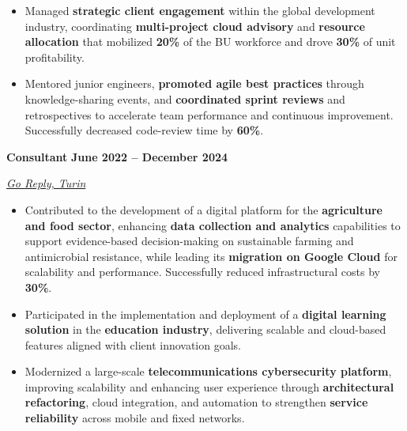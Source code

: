 \documentclass[9pt, a4paper]{article}
\newcommand{\cvsubsection}[3]{%
	\par {\large\bfseries #1} \hfill {\bfseries #2} \par {\textit{#3}} \vspace{4pt}
}
\begin{document}
\begin{minipage}[t]{0.65\linewidth}
\begin{itemize}[leftmargin=*, nosep]
			\vspace{2pt}
			\item \footnotesize Managed \textbf{strategic client engagement} within the global development industry, coordinating \textbf{multi-project cloud advisory} and \textbf{resource allocation} that mobilized \textbf{20\%} of the BU workforce and drove \textbf{30\%} of unit profitability.
			
			\vspace{2pt}
			\item \footnotesize Mentored junior engineers, \textbf{promoted agile best practices} through knowledge-sharing events, and \textbf{coordinated sprint reviews} and retrospectives to accelerate team performance and continuous improvement. 
			Successfully decreased code-review time by \textbf{60\%}.  
		\end{itemize}
		
		\vspace{6pt}
		\cvsubsection{Consultant}{June 2022 -- December 2024}{\href{https://www.reply.com/go-reply/en}{Go Reply, Turin}}
		\begin{itemize}[leftmargin=*, nosep]
			
			\item \footnotesize Contributed to the development of a digital platform for the \textbf{agriculture and food sector}, enhancing \textbf{data collection and analytics} capabilities to support evidence-based decision-making on sustainable farming and antimicrobial resistance, while leading its \textbf{migration on Google Cloud} for scalability and performance. Successfully reduced infrastructural costs by \textbf{30\%}.
			
			\vspace{2pt}
			\item \footnotesize Participated in the implementation and deployment of a \textbf{digital learning solution} in the \textbf{education industry}, delivering scalable and cloud-based features aligned with client innovation goals.
			
			\vspace{2pt}
			\item \footnotesize Modernized a large-scale \textbf{telecommunications cybersecurity platform}, improving scalability and enhancing user experience through \textbf{architectural refactoring}, cloud integration, and automation to strengthen \textbf{service reliability} across mobile and fixed networks. 
		\end{itemize}
		

\end{minipage}
\end{document}
